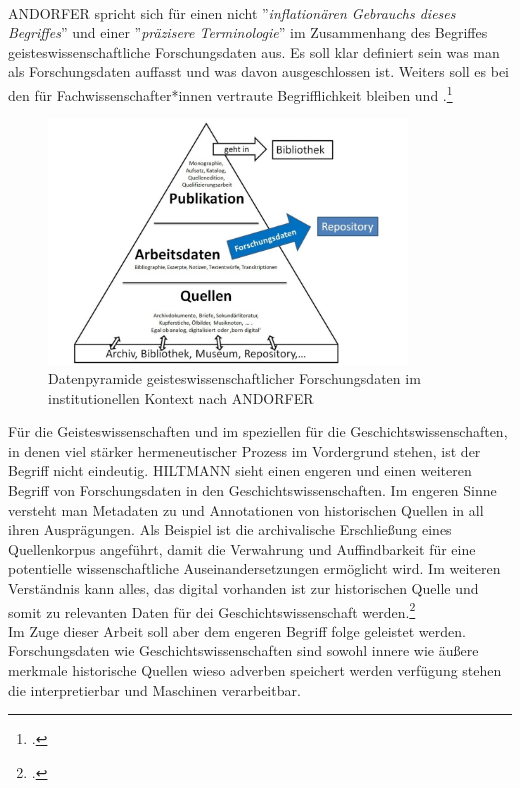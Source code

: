\documentclass[12pt,a4paper]{article}
\begin{document}
\\
ANDORFER spricht sich für einen nicht ''\textit{inflationären Gebrauchs dieses Begriffes}'' und einer ''\textit{präzisere   Terminologie}'' im Zusammenhang des Begriffes geisteswissenschaftliche Forschungsdaten aus. Es soll klar definiert sein was man als Forschungsdaten auffasst und was davon ausgeschlossen ist. Weiters soll es bei den für Fachwissenschafter*innen vertraute Begrifflichkeit bleiben und .\footcite[][]{andorfer2015forschungsdaten}
\begin{figure}[H]
\centering
	\includegraphics[width=0.85\textwidth]{img/forschungsdaten.png}  
    \caption[Datenpyramide geisteswissenschaftlicher Forschungsdaten im institutionellen Kontext, ANDORFER, Peter: Forschungsdaten in den (digitalen) Geisteswissenschaften: Versuch einer Konkretisierung, 2015, S.14]{Datenpyramide geisteswissenschaftlicher Forschungsdaten im institutionellen Kontext nach ANDORFER} \label{fig:forschungsdaten}
\end{figure} 
Für die Geisteswissenschaften und im speziellen für die Geschichtswissenschaften, in denen viel stärker hermeneutischer Prozess  im Vordergrund stehen, ist der Begriff nicht eindeutig. HILTMANN sieht einen engeren und einen weiteren  Begriff von Forschungsdaten in den Geschichtswissenschaften. Im engeren Sinne versteht man Metadaten zu und Annotationen von historischen Quellen in all ihren Ausprägungen. Als Beispiel ist die archivalische Erschließung eines Quellenkorpus angeführt, damit die Verwahrung und Auffindbarkeit für eine potentielle wissenschaftliche Auseinandersetzungen ermöglicht wird. Im weiteren Verständnis kann alles, das digital vorhanden ist zur historischen Quelle und somit zu relevanten Daten für dei Geschichtswissenschaft werden.\footcite[Vgl.][09.06.2019.]{hiltman2018forschungsdaten}
\\
Im Zuge dieser Arbeit soll aber dem engeren Begriff folge geleistet werden. Forschungsdaten wie Geschichtswissenschaften sind sowohl innere wie äußere merkmale historische Quellen wieso adverben speichert werden verfügung stehen die interpretierbar und Maschinen verarbeitbar. 
\end{document}
